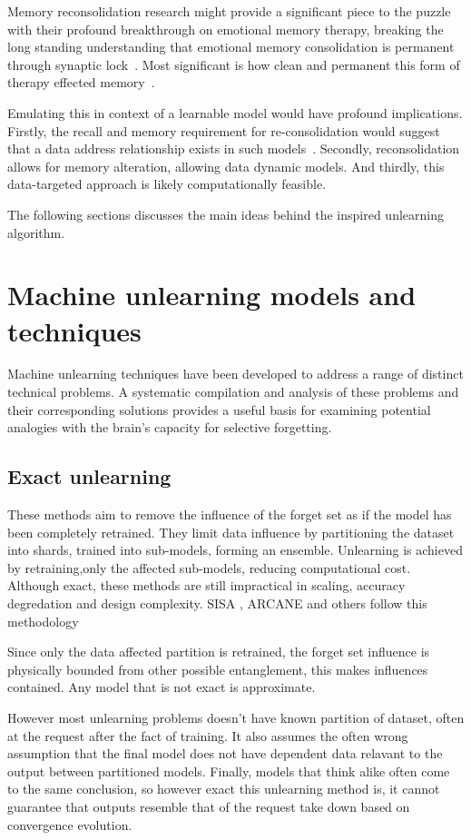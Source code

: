 \documentclass{surreydissertation}
\begin{document}
Memory reconsolidation research might provide a significant piece to the puzzle with their profound breakthrough on emotional memory therapy, breaking the long standing understanding that emotional memory consolidation is permanent through synaptic lock~\cite{brunet2008,brunet2014,brunet2018,wright2021}. Most significant is how clean and permanent this form of therapy effected memory~\cite{kamboj2020}.

Emulating this in context of a learnable model would have profound implications. Firstly, the recall and memory requirement for re-consolidation would suggest that a data address relationship exists in such models~\cite{ramsauer2020}. Secondly, reconsolidation allows for memory alteration, allowing data dynamic models. And thirdly, this data-targeted approach is likely computationally feasible.

The following sections discusses the main ideas behind the inspired unlearning algorithm.

\section{Machine unlearning models and techniques}
Machine unlearning techniques have been developed to address a range of distinct technical problems. A systematic compilation and analysis of these problems and their corresponding solutions provides a useful basis for examining potential analogies with the brain’s capacity for selective forgetting.

\subsection{Exact unlearning}  
These methods aim to remove the influence of the forget set as if the model has been completely retrained. They limit data influence by partitioning the dataset into shards, trained into sub-models, forming an ensemble. Unlearning is achieved by retraining,only the affected sub-models, reducing computational cost. Although exact, these methods are still impractical in scaling, accuracy degredation and design complexity. SISA \cite{bourtoule2021sisa}, ARCANE \cite{arcane2022} and others follow this methodology

Since only the data affected partition is retrained, the forget set influence is physically bounded from other possible entanglement, this makes influences contained. Any model that is not exact is approximate.

However most unlearning problems doesn't have known partition of dataset, often at the request after the fact of training. It also assumes the often wrong assumption that the final model does not have dependent data relavant to the output between partitioned models. Finally, models that think alike often come to the same conclusion, so however exact this unlearning method is, it cannot guarantee that outputs resemble that of the request take down based on convergence evolution.
\end{document}
